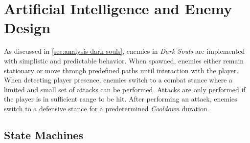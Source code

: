 





\section{Artificial Intelligence and Enemy Design}

As discussed in \ref{sec:analysis-dark-souls}, enemies in \emph{Dark Souls} are implemented with simplistic and predictable behavior. When spawned, enemies either remain stationary or move through predefined paths until interaction with the player. When detecting player presence, enemies switch to a combat stance where a limited and small set of attacks can be performed. Attacks are only performed if the player is in sufficient range to be hit. After performing an attack, enemies switch to a defensive stance for a predetermined \emph{Cooldown} duration.


\subsection{State Machines}

